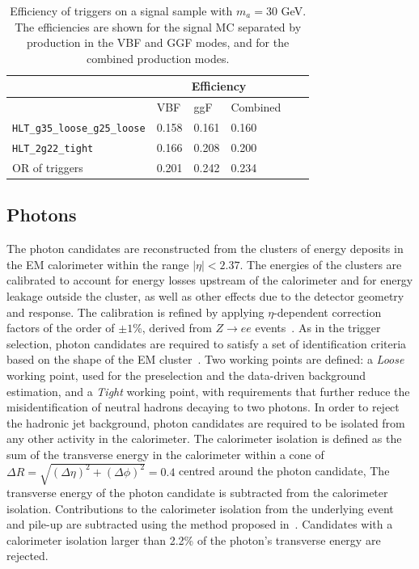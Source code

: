 \begin{table}[]
\centering
  \caption{Efficiency of triggers on a signal sample with $m_a=30$ GeV. The efficiencies are shown for the signal MC separated by production in the VBF and GGF modes, and for the combined production modes.}
\label{tab:HBSM:trigeff}
\begin{tabular}{|l|l|l|l|l|l|}
\hline
                                                      & \multicolumn{3}{c|}{Efficiency}  \\ \hline
                                                      & VBF      & ggF  & Combined   \\ \hline
\texttt{HLT\_g35\_loose\_g25\_loose}                  & 0.158  & 0.161 & 0.160\\ \hline
\texttt{HLT\_2g22\_tight}                             & 0.166  & 0.208 & 0.200\\ \hline
OR of triggers                                        & 0.201  & 0.242 & 0.234\\ \hline
\end{tabular}
\end{table}

\subsection{Photons}
\label{sec:HBSM:photons}
The photon candidates are reconstructed from the clusters of energy deposits in the EM calorimeter within the range $|\eta|<2.37$.
The energies of the clusters are calibrated to account for energy losses upstream of the calorimeter 
and for energy leakage outside the cluster, as well as other effects due to the detector geometry and response.
The calibration is refined by applying $\eta$-dependent correction factors of the order of $\pm1$\%, derived from $Z\to ee$ events~\cite{PERF-2013-05}.
As in the trigger selection, photon candidates are required to satisfy a set of identification criteria based on the shape of the EM cluster~\cite{PERF-2013-04}.
Two working points are defined: a \textit{Loose} working point, used for the preselection and the data-driven background estimation, and a 
\textit{Tight} working point, with requirements that further reduce the misidentification of neutral hadrons decaying to two photons.
In order to reject the hadronic jet background, photon candidates are required to be isolated from any other activity in the calorimeter.
The calorimeter isolation is defined as the sum of the transverse energy in the
calorimeter within a cone of \mbox{$\Delta R = \sqrt{(\Delta\eta)^2+(\Delta\phi)^2}=0.4$} centred around the photon candidate,
The transverse energy of the photon candidate is subtracted from the calorimeter isolation.
Contributions to the calorimeter isolation from the underlying event and pile-up are subtracted using the method proposed in~\cite{jetareas}.
Candidates with a calorimeter isolation larger than 2.2\% of the photon's transverse energy are rejected.

